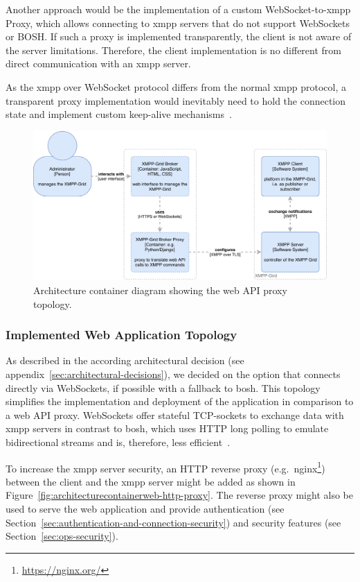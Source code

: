 Another approach would be the implementation of a custom WebSocket-to-\gls{xmpp} Proxy, which allows connecting to \gls{xmpp} servers that do not support WebSockets or BOSH.
If such a proxy is implemented transparently, the client is not aware of the server limitations.
Therefore, the client implementation is no different from direct communication with an \gls{xmpp} server.

As the \gls{xmpp} over WebSocket protocol differs from the normal \gls{xmpp} protocol, a transparent proxy implementation would inevitably need to hold the connection state and implement custom keep-alive mechanisms~\cite{rfc7395}.

\begin{figure}[H]
\centering
\includegraphics[width=0.8\linewidth]{resources/architecture_container_proxy}
\caption[Architecture container diagram: Web proxy]{Architecture container diagram showing the web API proxy topology.}
\label{fig:architecturecontainerwebproxy}
\end{figure}

\subsubsection{Implemented Web Application Topology}\label{sec:implemented-web-application-topology}

As described in the according architectural decision (see appendix~\ref{sec:architectural-decisions}), we decided on the option that connects directly via WebSockets, if possible with a fallback to \gls{bosh}.
This topology simplifies the implementation and deployment of the application in comparison to a web API proxy.
WebSockets offer stateful TCP-sockets to exchange data with \gls{xmpp} servers in contrast to \gls{bosh}, which uses HTTP long polling to emulate bidirectional streams and is, therefore, less efficient~\cite{xep-0124}.

To increase the \gls{xmpp} server security, an HTTP reverse proxy (e.g.\ nginx\footnote{\url{https://nginx.org/}}) between the client and the \gls{xmpp} server might be added as shown in Figure~\ref{fig:architecturecontainerweb-http-proxy}.
The reverse proxy might also be used to serve the web application and provide authentication (see Section~\ref{sec:authentication-and-connection-security}) and security features (see Section~\ref{sec:ops-security}).

